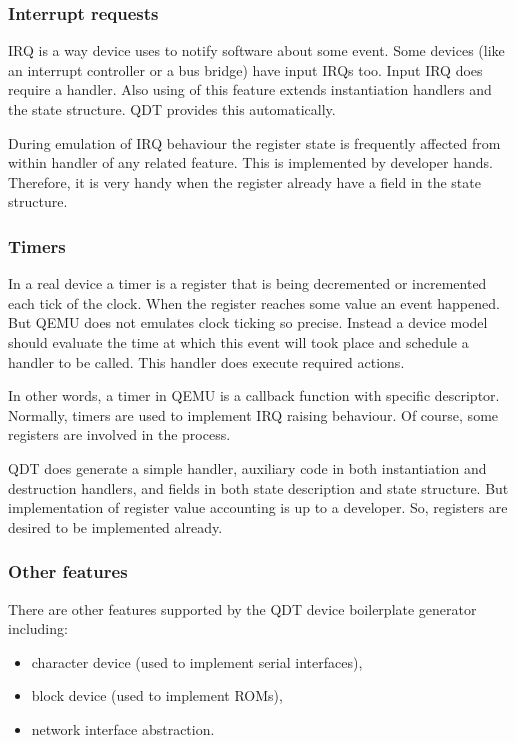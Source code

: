 \documentclass[conference,compsoc,a4paper]{IEEEtran}
\begin{document}
\subsubsection{Interrupt requests}

IRQ is a way device uses to notify software about some event.
Some devices (like an interrupt controller or a bus bridge) have input
IRQs too.
Input IRQ does require a handler.
Also using of this feature extends instantiation handlers and the
state structure.
QDT provides this automatically.

During emulation of IRQ behaviour the register state is frequently
affected from within handler of any related feature.
This is implemented by developer hands.
Therefore, it is very handy when the register already have a field in the
state structure.

\subsubsection{Timers}

In a real device a timer is a register that is being decremented or
incremented each tick of the clock.
When the register reaches some value an event happened.
But QEMU does not emulates clock ticking so precise.
Instead a device model should evaluate the time at which this event will
took place and schedule a handler to be called.
This handler does execute required actions.

In other words, a timer in QEMU is a callback function with specific
descriptor.
Normally, timers are used to implement IRQ raising behaviour.
Of course, some registers are involved in the process.

QDT does generate a simple handler, auxiliary code in both instantiation
and destruction handlers, and fields in both state description and
state structure.
But implementation of register value accounting is up to a developer.
So, registers are desired to be implemented already.

\subsubsection{Other features}

There are other features supported by the QDT device boilerplate generator
including:

\begin{itemize}
    \item character device (used to implement serial interfaces),
    \item block device (used to implement ROMs),
    \item network interface abstraction.
\end{itemize}
\end{document}
